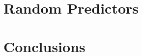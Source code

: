 \documentclass[11pt]{article}
\numberwithin{equation}{section}
\theoremstyle{boldStyle}
\begin{document}
\section{Random Predictors}





\section{Conclusions}
\end{document}
